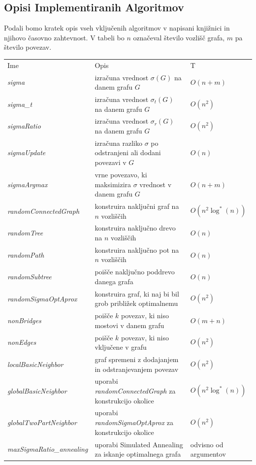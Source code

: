\documentclass[ letterpaper, titlepage, fleqn]{article}
\begin{document}
\subsection{Opisi Implementiranih Algoritmov}
Podali bomo kratek opis vseh vključenih algoritmov v napisani knjižnici in njihovo časovno zahtevnost.
V tabeli bo $n$ označeval število vozlišč grafa, $m$ pa število povezav.
\begin{center}
    \begin{tabular}{ l  l  l}
      Ime & Opis & T \\ 
      {\em sigma} & izračuna vrednost $\sigma(G)$ na danem grafu $G$ & $O(n + m)$ \\
      {\em sigma\_t} & izračuna vrednost $\sigma_t(G)$ na danem grafu $G$ & $O(n^2)$ \\
      {\em sigmaRatio} & izračuna vrednost $\sigma_r(G)$ na danem grafu $G$ & $O(n^2)$ \\
      {\em sigmaUpdate} & izračuna razliko $\sigma$ po odstranjeni ali dodani povezavi v $G$ & $O(n)$ \\
      {\em sigmaArgmax} & vrne povezavo, ki maksimizira $\sigma$ vrednost v danem grafu $G$ & $O(n + m)$ \\
      {\em randomConnectedGraph} & konstruira naključni graf na $n$ vozliščih &  $O(n^2 \log^*(n))$ \\ 
      {\em  randomTree} & konstruira naključno drevo na $n$  vozliščih & $O(n)$ \\
      {\em randomPath} & konstruira naključno pot na $n$ vozliščih & $O(n)$ \\
      {\em randomSubtree} & poišče naključno poddrevo danega grafa & $O(n)$ \\
      {\em randomSigmaOptAprox} & konstruira graf, ki naj bi bil grob približek optimalnemu & $O(n^2)$ \\
      {\em nonBridges} & poišče $k$ povezav, ki niso mostovi v danem grafu & $O(m + n)$ \\
      {\em nonEdges} & poišče $k$ povezav, ki niso vključene v grafu & $O(n^2)$ \\
      {\em localBasicNeighbor} & graf spremeni z dodajanjem in odstranjevanjem povezav & $O(n^2)$ \\
      {\em globalBasicNeighbor} & uporabi {\em randomConnectedGraph} za konstrukcijo okolice & $O(n^2 \log^*(n))$ \\ 
      {\em globalTwoPartNeighbor} & uporabi {\em randomSigmaOptAprox} za konstrukcijo okolice & $O(n^2)$ \\
      {\em maxSigmaRatio\_annealing} & uporabi Simulated Annealing za iskanje optimalnega grafa & odvisno od argumentov \\
    \end{tabular}
  \end{center}
\end{document}

